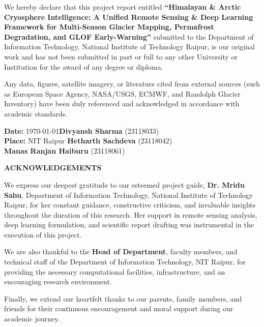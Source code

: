 \documentclass[12pt,a4paper]{report}
\begin{document}
We hereby declare that this project report entitled \textbf{``Himalayan \& Arctic Cryosphere Intelligence: A Unified Remote Sensing \& Deep Learning Framework for Multi-Season Glacier Mapping, Permafrost Degradation, and GLOF Early-Warning''} submitted to the Department of Information Technology, National Institute of Technology Raipur, is our original work and has not been submitted in part or full to any other University or Institution for the award of any degree or diploma.

Any data, figures, satellite imagery, or literature cited from external sources (such as European Space Agency, NASA/USGS, ECMWF, and Randolph Glacier Inventory) have been duly referenced and acknowledged in accordance with academic standards.

\vspace{2.0cm}

\noindent
\textbf{Date:} \today \hfill \textbf{Divyansh Sharma} (23118033)\\
\textbf{Place:} NIT Raipur \hfill \textbf{Hetharth Sachdeva} (23118042)\\
\null \hfill \textbf{Manas Ranjan Haiburu} (23118061)

\newpage
\thispagestyle{plain}
\begin{center}
    {\LARGE \textbf{ACKNOWLEDGEMENTS}}\\[0.8cm]
\end{center}

We express our deepest gratitude to our esteemed project guide, \textbf{Dr. Mridu Sahu}, Department of Information Technology, National Institute of Technology Raipur, for her constant guidance, constructive criticism, and invaluable insights throughout the duration of this research. Her support in remote sensing analysis, deep learning formulation, and scientific report drafting was instrumental in the execution of this project.

We are also thankful to the \textbf{Head of Department}, faculty members, and technical staff of the Department of Information Technology, NIT Raipur, for providing the necessary computational facilities, infrastructure, and an encouraging research environment.

Finally, we extend our heartfelt thanks to our parents, family members, and friends for their continuous encouragement and moral support during our academic journey.
\end{document}
